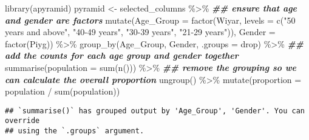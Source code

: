 \documentclass[
]{article}
\newenvironment{Shaded}{\begin{snugshade}}{\end{snugshade}}
\newcommand{\AttributeTok}[1]{\textcolor[rgb]{0.77,0.63,0.00}{#1}}
\newcommand{\DocumentationTok}[1]{\textcolor[rgb]{0.56,0.35,0.01}{\textbf{\textit{#1}}}}
\newcommand{\FunctionTok}[1]{\textcolor[rgb]{0.00,0.00,0.00}{#1}}
\newcommand{\NormalTok}[1]{#1}
\newcommand{\OtherTok}[1]{\textcolor[rgb]{0.56,0.35,0.01}{#1}}
\newcommand{\SpecialCharTok}[1]{\textcolor[rgb]{0.00,0.00,0.00}{#1}}
\newcommand{\StringTok}[1]{\textcolor[rgb]{0.31,0.60,0.02}{#1}}
\begin{document}
\begin{Shaded}
\begin{Highlighting}[]
\FunctionTok{library}\NormalTok{(apyramid)}
\NormalTok{pyramid }\OtherTok{\textless{}{-}}\NormalTok{ selected\_columns }\SpecialCharTok{\%\textgreater{}\%}
  \DocumentationTok{\#\# ensure that age and gender are factors}
  \FunctionTok{mutate}\NormalTok{(}\AttributeTok{Age\_Group =} \FunctionTok{factor}\NormalTok{(Wiyar, }\AttributeTok{levels =} \FunctionTok{c}\NormalTok{(}\StringTok{"50 years and above"}\NormalTok{,}
                                       \StringTok{"40{-}49 years"}\NormalTok{,}
                                       \StringTok{"30{-}39 years"}\NormalTok{,}
                                       \StringTok{"21{-}29 years"}\NormalTok{)),}
         \AttributeTok{Gender =} \FunctionTok{factor}\NormalTok{(Piyg)) }\SpecialCharTok{\%\textgreater{}\%}
  \FunctionTok{group\_by}\NormalTok{(Age\_Group, Gender, }\AttributeTok{.groups =} \StringTok{\textquotesingle{}drop\textquotesingle{}}\NormalTok{) }\SpecialCharTok{\%\textgreater{}\%}
  \DocumentationTok{\#\# add the counts for each age group and gender together}
  \FunctionTok{summarise}\NormalTok{(}\AttributeTok{population =} \FunctionTok{sum}\NormalTok{(}\FunctionTok{n}\NormalTok{())) }\SpecialCharTok{\%\textgreater{}\%}
  \DocumentationTok{\#\# remove the grouping so we can calculate the overall proportion}
  \FunctionTok{ungroup}\NormalTok{() }\SpecialCharTok{\%\textgreater{}\%}
  \FunctionTok{mutate}\NormalTok{(}\AttributeTok{proportion =}\NormalTok{ population }\SpecialCharTok{/} \FunctionTok{sum}\NormalTok{(population))}
\end{Highlighting}
\end{Shaded}

\begin{verbatim}
## `summarise()` has grouped output by 'Age_Group', 'Gender'. You can override
## using the `.groups` argument.
\end{verbatim}
\end{document}
